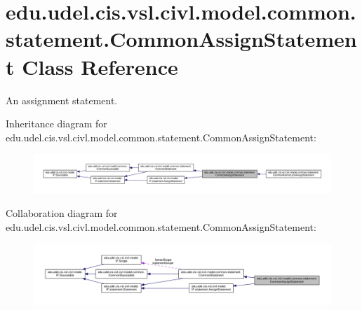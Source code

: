 \hypertarget{classedu_1_1udel_1_1cis_1_1vsl_1_1civl_1_1model_1_1common_1_1statement_1_1CommonAssignStatement}{}\section{edu.\+udel.\+cis.\+vsl.\+civl.\+model.\+common.\+statement.\+Common\+Assign\+Statement Class Reference}
\label{classedu_1_1udel_1_1cis_1_1vsl_1_1civl_1_1model_1_1common_1_1statement_1_1CommonAssignStatement}


An assignment statement.  




Inheritance diagram for edu.\+udel.\+cis.\+vsl.\+civl.\+model.\+common.\+statement.\+Common\+Assign\+Statement\+:
\nopagebreak
\begin{figure}[H]
\begin{center}
\leavevmode
\includegraphics[width=350pt]{classedu_1_1udel_1_1cis_1_1vsl_1_1civl_1_1model_1_1common_1_1statement_1_1CommonAssignStatement__inherit__graph}
\end{center}
\end{figure}


Collaboration diagram for edu.\+udel.\+cis.\+vsl.\+civl.\+model.\+common.\+statement.\+Common\+Assign\+Statement\+:
\nopagebreak
\begin{figure}[H]
\begin{center}
\leavevmode
\includegraphics[width=350pt]{classedu_1_1udel_1_1cis_1_1vsl_1_1civl_1_1model_1_1common_1_1statement_1_1CommonAssignStatement__coll__graph}
\end{center}
\end{figure}
